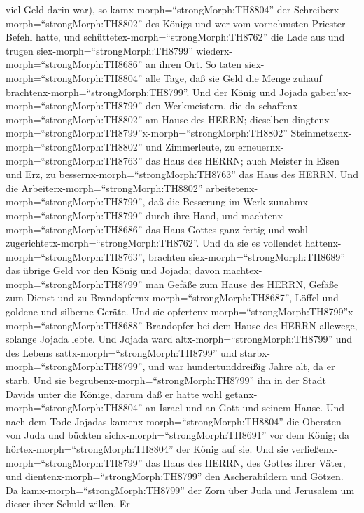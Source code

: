viel Geld darin war), so kamx-morph=``strongMorph:TH8804'' der
Schreiberx-morph=``strongMorph:TH8802'' des Königs und wer vom
vornehmsten Priester Befehl hatte, und
schüttetex-morph=``strongMorph:TH8762'' die Lade aus und trugen
siex-morph=``strongMorph:TH8799'' wiederx-morph=``strongMorph:TH8686''
an ihren Ort. So taten siex-morph=``strongMorph:TH8804'' alle Tage, daß
sie Geld die Menge zuhauf brachtenx-morph=``strongMorph:TH8799''.
 Und der König und Jojada
gaben'sx-morph=``strongMorph:TH8799'' den Werkmeistern, die da
schaffenx-morph=``strongMorph:TH8802'' am Hause des HERRN; dieselben
dingtenx-morph=``strongMorph:TH8799''x-morph=``strongMorph:TH8802''
Steinmetzenx-morph=``strongMorph:TH8802'' und Zimmerleute, zu
erneuernx-morph=``strongMorph:TH8763'' das Haus des HERRN; auch Meister
in Eisen und Erz, zu bessernx-morph=``strongMorph:TH8763'' das Haus des
HERRN.  Und die Arbeiterx-morph=``strongMorph:TH8802''
arbeitetenx-morph=``strongMorph:TH8799'', daß die Besserung im Werk
zunahmx-morph=``strongMorph:TH8799'' durch ihre Hand, und
machtenx-morph=``strongMorph:TH8686'' das Haus Gottes ganz fertig und
wohl zugerichtetx-morph=``strongMorph:TH8762''.  Und da sie
es vollendet hattenx-morph=``strongMorph:TH8763'', brachten
siex-morph=``strongMorph:TH8689'' das übrige Geld vor den König und
Jojada; davon machtex-morph=``strongMorph:TH8799'' man Gefäße zum Hause
des HERRN, Gefäße zum Dienst und zu
Brandopfernx-morph=``strongMorph:TH8687'', Löffel und goldene und
silberne Geräte. Und sie
opfertenx-morph=``strongMorph:TH8799''x-morph=``strongMorph:TH8688''
Brandopfer bei dem Hause des HERRN allewege, solange Jojada lebte.
 Und Jojada ward altx-morph=``strongMorph:TH8799'' und des
Lebens sattx-morph=``strongMorph:TH8799'' und
starbx-morph=``strongMorph:TH8799'', und war hundertunddreißig Jahre
alt, da er starb.  Und sie
begrubenx-morph=``strongMorph:TH8799'' ihn in der Stadt Davids unter die
Könige, darum daß er hatte wohl getanx-morph=``strongMorph:TH8804'' an
Israel und an Gott und seinem Hause.  Und nach dem Tode
Jojadas kamenx-morph=``strongMorph:TH8804'' die Obersten von Juda und
bückten sichx-morph=``strongMorph:TH8691'' vor dem König; da
hörtex-morph=``strongMorph:TH8804'' der König auf sie.  Und
sie verließenx-morph=``strongMorph:TH8799'' das Haus des HERRN, des
Gottes ihrer Väter, und dientenx-morph=``strongMorph:TH8799'' den
Ascherabildern und Götzen. Da kamx-morph=``strongMorph:TH8799'' der Zorn
über Juda und Jerusalem um dieser ihrer Schuld willen.  Er
